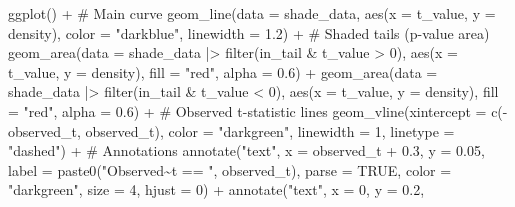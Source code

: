 \documentclass[
  letterpaper,
  DIV=11,
  numbers=noendperiod]{scrreprt}
\newenvironment{Shaded}{\begin{snugshade}}{\end{snugshade}}
\newcommand{\AttributeTok}[1]{\textcolor[rgb]{0.40,0.45,0.13}{#1}}
\newcommand{\CommentTok}[1]{\textcolor[rgb]{0.37,0.37,0.37}{#1}}
\newcommand{\ConstantTok}[1]{\textcolor[rgb]{0.56,0.35,0.01}{#1}}
\newcommand{\DecValTok}[1]{\textcolor[rgb]{0.68,0.00,0.00}{#1}}
\newcommand{\FloatTok}[1]{\textcolor[rgb]{0.68,0.00,0.00}{#1}}
\newcommand{\FunctionTok}[1]{\textcolor[rgb]{0.28,0.35,0.67}{#1}}
\newcommand{\NormalTok}[1]{\textcolor[rgb]{0.00,0.23,0.31}{#1}}
\newcommand{\SpecialCharTok}[1]{\textcolor[rgb]{0.37,0.37,0.37}{#1}}
\newcommand{\StringTok}[1]{\textcolor[rgb]{0.13,0.47,0.30}{#1}}
\begin{document}
\begin{Shaded}
\begin{Highlighting}[]
\FunctionTok{ggplot}\NormalTok{() }\SpecialCharTok{+}
  \CommentTok{\# Main curve}
  \FunctionTok{geom\_line}\NormalTok{(}\AttributeTok{data =}\NormalTok{ shade\_data, }\FunctionTok{aes}\NormalTok{(}\AttributeTok{x =}\NormalTok{ t\_value, }\AttributeTok{y =}\NormalTok{ density),}
            \AttributeTok{color =} \StringTok{"darkblue"}\NormalTok{, }\AttributeTok{linewidth =} \FloatTok{1.2}\NormalTok{) }\SpecialCharTok{+}
  \CommentTok{\# Shaded tails (p{-}value area)}
  \FunctionTok{geom\_area}\NormalTok{(}\AttributeTok{data =}\NormalTok{ shade\_data }\SpecialCharTok{|\textgreater{}} \FunctionTok{filter}\NormalTok{(in\_tail }\SpecialCharTok{\&}\NormalTok{ t\_value }\SpecialCharTok{\textgreater{}} \DecValTok{0}\NormalTok{),}
            \FunctionTok{aes}\NormalTok{(}\AttributeTok{x =}\NormalTok{ t\_value, }\AttributeTok{y =}\NormalTok{ density),}
            \AttributeTok{fill =} \StringTok{"red"}\NormalTok{, }\AttributeTok{alpha =} \FloatTok{0.6}\NormalTok{) }\SpecialCharTok{+}
  \FunctionTok{geom\_area}\NormalTok{(}\AttributeTok{data =}\NormalTok{ shade\_data }\SpecialCharTok{|\textgreater{}} \FunctionTok{filter}\NormalTok{(in\_tail }\SpecialCharTok{\&}\NormalTok{ t\_value }\SpecialCharTok{\textless{}} \DecValTok{0}\NormalTok{),}
            \FunctionTok{aes}\NormalTok{(}\AttributeTok{x =}\NormalTok{ t\_value, }\AttributeTok{y =}\NormalTok{ density),}
            \AttributeTok{fill =} \StringTok{"red"}\NormalTok{, }\AttributeTok{alpha =} \FloatTok{0.6}\NormalTok{) }\SpecialCharTok{+}
  \CommentTok{\# Observed t{-}statistic lines}
  \FunctionTok{geom\_vline}\NormalTok{(}\AttributeTok{xintercept =} \FunctionTok{c}\NormalTok{(}\SpecialCharTok{{-}}\NormalTok{observed\_t, observed\_t),}
             \AttributeTok{color =} \StringTok{"darkgreen"}\NormalTok{, }\AttributeTok{linewidth =} \DecValTok{1}\NormalTok{, }\AttributeTok{linetype =} \StringTok{"dashed"}\NormalTok{) }\SpecialCharTok{+}
  \CommentTok{\# Annotations}
  \FunctionTok{annotate}\NormalTok{(}\StringTok{"text"}\NormalTok{, }\AttributeTok{x =}\NormalTok{ observed\_t }\SpecialCharTok{+} \FloatTok{0.3}\NormalTok{, }\AttributeTok{y =} \FloatTok{0.05}\NormalTok{,}
           \AttributeTok{label =} \FunctionTok{paste0}\NormalTok{(}\StringTok{"\textquotesingle{}Observed\textquotesingle{}\textasciitilde{}t == "}\NormalTok{, observed\_t),}
           \AttributeTok{parse =} \ConstantTok{TRUE}\NormalTok{, }\AttributeTok{color =} \StringTok{"darkgreen"}\NormalTok{, }\AttributeTok{size =} \DecValTok{4}\NormalTok{, }\AttributeTok{hjust =} \DecValTok{0}\NormalTok{) }\SpecialCharTok{+}
  \FunctionTok{annotate}\NormalTok{(}\StringTok{"text"}\NormalTok{, }\AttributeTok{x =} \DecValTok{0}\NormalTok{, }\AttributeTok{y =} \FloatTok{0.2}\NormalTok{,}

\end{Highlighting}
\end{Shaded}
\end{document}
